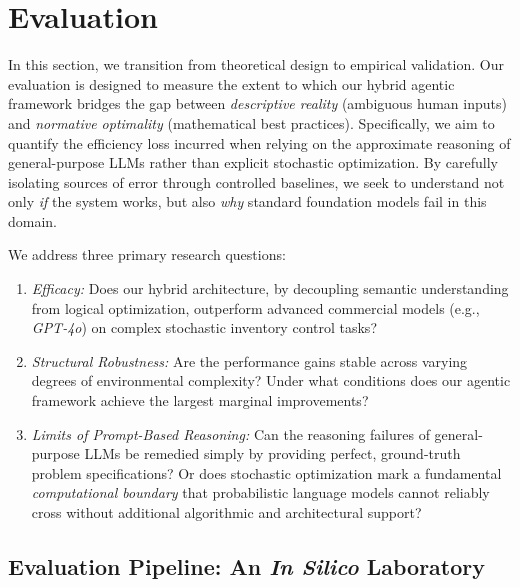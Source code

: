 \documentclass[mnsc,nonblindrev]{informs3_hide}
\begin{document}
    
\section{Evaluation}\label{sec:eval}



In this section, we transition from theoretical design to empirical validation. Our evaluation is designed to measure the extent to which our hybrid agentic framework bridges the gap between \emph{descriptive reality} (ambiguous human inputs) and \emph{normative optimality} (mathematical best practices). Specifically, we aim to quantify the efficiency loss incurred when relying on the approximate reasoning of general-purpose LLMs rather than explicit stochastic optimization. By carefully isolating sources of error through controlled baselines, we seek to understand not only \emph{if} the system works, but also \emph{why} standard foundation models fail in this domain.


We address three primary research questions:

\begin{enumerate} 
\item \emph{Efficacy:} Does our hybrid architecture, by decoupling semantic understanding from logical optimization, outperform advanced commercial models (e.g., \emph{GPT-4o}) on complex stochastic inventory control tasks?

\item \emph{Structural Robustness:} Are the performance gains stable across varying degrees of environmental complexity? Under what conditions does our agentic framework achieve the largest marginal improvements?

\item \emph{Limits of Prompt-Based Reasoning:} Can the reasoning failures of general-purpose LLMs be remedied simply by providing perfect, ground-truth problem specifications? Or does stochastic optimization mark a fundamental \emph{computational boundary} that probabilistic language models cannot reliably cross without additional algorithmic and architectural support?

\end{enumerate}



\subsection{Evaluation Pipeline: An \textit{In Silico} Laboratory}
\end{document}
